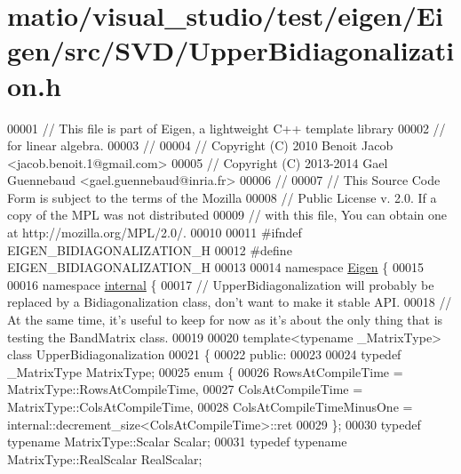 \hypertarget{matio_2visual__studio_2test_2eigen_2_eigen_2src_2_s_v_d_2_upper_bidiagonalization_8h_source}{}\section{matio/visual\+\_\+studio/test/eigen/\+Eigen/src/\+S\+V\+D/\+Upper\+Bidiagonalization.h}
\label{matio_2visual__studio_2test_2eigen_2_eigen_2src_2_s_v_d_2_upper_bidiagonalization_8h_source}

\begin{DoxyCode}
00001 \textcolor{comment}{// This file is part of Eigen, a lightweight C++ template library}
00002 \textcolor{comment}{// for linear algebra.}
00003 \textcolor{comment}{//}
00004 \textcolor{comment}{// Copyright (C) 2010 Benoit Jacob <jacob.benoit.1@gmail.com>}
00005 \textcolor{comment}{// Copyright (C) 2013-2014 Gael Guennebaud <gael.guennebaud@inria.fr>}
00006 \textcolor{comment}{//}
00007 \textcolor{comment}{// This Source Code Form is subject to the terms of the Mozilla}
00008 \textcolor{comment}{// Public License v. 2.0. If a copy of the MPL was not distributed}
00009 \textcolor{comment}{// with this file, You can obtain one at http://mozilla.org/MPL/2.0/.}
00010 
00011 \textcolor{preprocessor}{#ifndef EIGEN\_BIDIAGONALIZATION\_H}
00012 \textcolor{preprocessor}{#define EIGEN\_BIDIAGONALIZATION\_H}
00013 
00014 \textcolor{keyword}{namespace }\hyperlink{namespace_eigen}{Eigen} \{ 
00015 
00016 \textcolor{keyword}{namespace }\hyperlink{namespaceinternal}{internal} \{
00017 \textcolor{comment}{// UpperBidiagonalization will probably be replaced by a Bidiagonalization class, don't want to make it
       stable API.}
00018 \textcolor{comment}{// At the same time, it's useful to keep for now as it's about the only thing that is testing the
       BandMatrix class.}
00019 
00020 \textcolor{keyword}{template}<\textcolor{keyword}{typename} \_MatrixType> \textcolor{keyword}{class }UpperBidiagonalization
00021 \{
00022   \textcolor{keyword}{public}:
00023 
00024     \textcolor{keyword}{typedef} \_MatrixType MatrixType;
00025     \textcolor{keyword}{enum} \{
00026       RowsAtCompileTime = MatrixType::RowsAtCompileTime,
00027       ColsAtCompileTime = MatrixType::ColsAtCompileTime,
00028       ColsAtCompileTimeMinusOne = internal::decrement\_size<ColsAtCompileTime>::ret
00029     \};
00030     \textcolor{keyword}{typedef} \textcolor{keyword}{typename} MatrixType::Scalar Scalar;
00031     \textcolor{keyword}{typedef} \textcolor{keyword}{typename} MatrixType::RealScalar RealScalar;

\end{DoxyCode}
